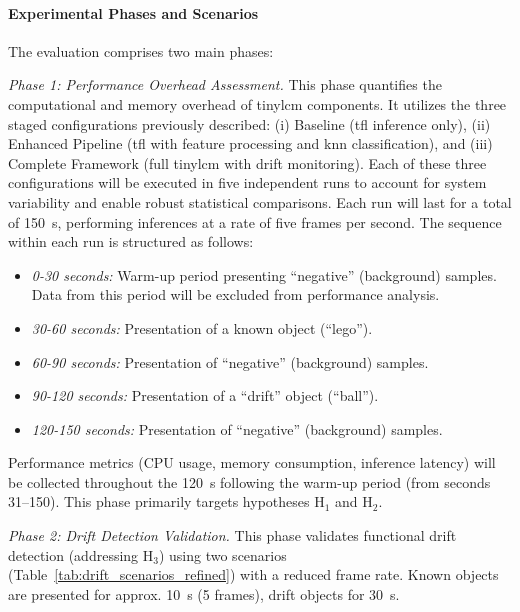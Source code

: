 \paragraph{Experimental Phases and Scenarios}
The evaluation comprises two main phases:

\textit{Phase 1: Performance Overhead Assessment.} This phase quantifies the computational and memory overhead of \gls{tinylcm} components. It utilizes the three staged configurations previously described: (i) Baseline (\gls{tfl} inference only), (ii) Enhanced Pipeline (\gls{tfl} with feature processing and \gls{knn} classification), and (iii) Complete Framework (full \gls{tinylcm} with drift monitoring).
Each of these three configurations will be executed in five independent runs to account for system variability and enable robust statistical comparisons. Each run will last for a total of \SI{150}{\second}, performing inferences at a rate of five frames per second. The sequence within each run is structured as follows:
\begin{itemize}[noitemsep, topsep=0pt, leftmargin=1em]
    \item \textit{0-30 seconds:} Warm-up period presenting ``negative'' (background) samples. Data from this period will be excluded from performance analysis.
    \item \textit{30-60 seconds:} Presentation of a known object (``lego'').
    \item \textit{60-90 seconds:} Presentation of ``negative'' (background) samples.
    \item \textit{90-120 seconds:} Presentation of a ``drift'' object (``ball'').
    \item \textit{120-150 seconds:} Presentation of ``negative'' (background) samples.
\end{itemize}
Performance metrics (CPU usage, memory consumption, inference latency) will be collected throughout the \SI{120}{\second} following the warm-up period (from seconds 31--150). This phase primarily targets hypotheses H$_1$ and H$_2$.

\textit{Phase 2: Drift Detection Validation.} This phase validates functional drift detection (addressing H$_3$) using two scenarios (Table~\ref{tab:drift_scenarios_refined}) with a reduced frame rate. Known objects are presented for approx. \SI{10}{\second} (5 frames), drift objects for \SI{30}{\second}.

